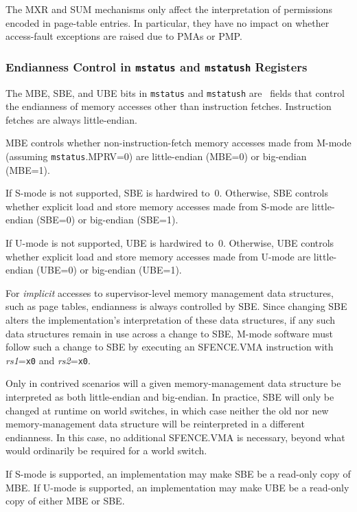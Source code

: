 The MXR and SUM mechanisms only affect the interpretation of permissions
encoded in page-table entries.  In particular, they have no impact on whether
access-fault exceptions are raised due to PMAs or PMP.

\subsubsection{Endianness Control in {\tt mstatus} and {\tt mstatush} Registers}

The MBE, SBE, and UBE bits in {\tt mstatus} and {\tt mstatush} are
\warl\ fields that control the endianness of memory accesses other than
instruction fetches.
Instruction fetches are always little-endian.

MBE controls whether non-instruction-fetch memory accesses made from
M-mode (assuming {\tt mstatus}.MPRV=0) are little-endian (MBE=0) or
big-endian (MBE=1).

If S-mode is not supported, SBE is hardwired to~0.
Otherwise, SBE controls whether explicit load and store memory accesses made
from S-mode are little-endian (SBE=0) or big-endian (SBE=1).

If U-mode is not supported, UBE is hardwired to~0.
Otherwise, UBE controls whether explicit load and store memory accesses made
from U-mode are little-endian (UBE=0) or big-endian (UBE=1).

For {\em implicit} accesses to supervisor-level memory management data
structures, such as page tables, endianness is always controlled by SBE.
Since changing SBE alters the implementation's interpretation of these data
structures, if any such data structures remain in use across a change to SBE,
M-mode software must follow such a change to SBE by executing an
SFENCE.VMA instruction with {\em rs1}={\tt x0} and {\em rs2}={\tt x0}.

\begin{commentary}
Only in contrived scenarios will a given memory-management data structure be
interpreted as both little-endian and big-endian.
In practice, SBE will only be changed at runtime on world switches, in which
case neither the old nor new memory-management data structure will be
reinterpreted in a different endianness.
In this case, no additional SFENCE.VMA is necessary, beyond what would
ordinarily be required for a world switch.
\end{commentary}

If S-mode is supported, an implementation may make SBE be a read-only
copy of MBE.
If U-mode is supported, an implementation may make UBE be a read-only
copy of either MBE or SBE.

